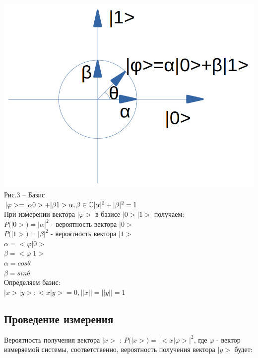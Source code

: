 \documentclass[11pt]{report}
\begin{document}
\includegraphics[scale=0.3]{basis}\\
Рис.3 -- Базис \\

$|\varphi> = |\alpha 0> +|\beta 1>\\
\alpha,\beta \in \mathbb{C}\\
|\alpha|^2+|\beta|^2=1
$ \\

При измерении вектора $|\varphi>$ в базисе $|0>|1>$ получаем:\\

$P(|0>)=|\alpha|^2$ - вероятность вектора $|0>$\\

$P(|1>)=|\beta|^2$ - вероятность вектора $|1>$\\

$\alpha =<\varphi|0>$ \\

$\beta =<\varphi|1>$ \\

$\alpha = cos\theta$ \\

$\beta = sin\theta$ \\

Определяем базис:\\
$|x>|y> : <x|y>=0, ||x||=||y||=1$ \\

\subsection{Проведение измерения}
Вероятность получения вектора $|x>$ : $P(|x>)=|<x|\varphi>|^2$, где $\varphi$ - вектор измеряемой системы, соответственно, вероятность получения вектора $|y>$ будет:\\
\end{document}
